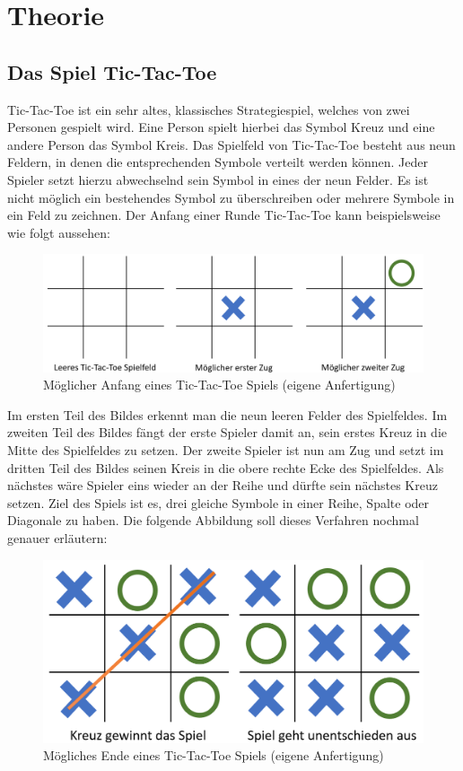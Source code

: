 \chapter{Theorie}
\section{Das Spiel Tic-Tac-Toe}

Tic-Tac-Toe ist ein sehr altes, klassisches Strategiespiel, welches von zwei Personen gespielt wird. Eine Person
spielt hierbei das Symbol Kreuz und eine andere Person das Symbol Kreis. Das Spielfeld von Tic-Tac-Toe besteht aus
neun Feldern, in denen die entsprechenden Symbole verteilt werden können. Jeder Spieler setzt hierzu abwechselnd sein
Symbol in eines der neun Felder. Es ist nicht möglich ein bestehendes Symbol zu überschreiben oder mehrere Symbole in
ein Feld zu zeichnen. Der Anfang einer Runde Tic-Tac-Toe kann beispielsweise wie folgt aussehen:
\begin{figure}[H]
    \centering
    \includegraphics[scale=0.25]{img/tictactoe_start.png}
    \caption[Möglicher Anfang eines Tic-Tac-Toe Spiels]{Möglicher Anfang eines Tic-Tac-Toe Spiels (eigene Anfertigung)}
\end{figure}
Im ersten Teil des Bildes erkennt man die neun leeren Felder des Spielfeldes. Im zweiten Teil des Bildes fängt der erste
Spieler damit an, sein erstes Kreuz in die Mitte des Spielfeldes zu setzen. Der zweite Spieler ist nun am Zug und setzt
im dritten Teil des Bildes seinen Kreis in die obere rechte Ecke des Spielfeldes. Als nächstes wäre Spieler eins wieder an
der Reihe und dürfte sein nächstes Kreuz setzen. Ziel des Spiels ist es, drei gleiche Symbole in einer Reihe, Spalte oder
Diagonale zu haben. Die folgende Abbildung soll dieses Verfahren nochmal genauer erläutern:
\begin{figure}[H]
    \centering
    \includegraphics[scale=0.25]{img/tictactoe_endings.png} 
    \caption[Mögliches Ende eines Tic-Tac-Toe Spiels]{Mögliches Ende eines Tic-Tac-Toe Spiels (eigene Anfertigung)}
\end{figure}

